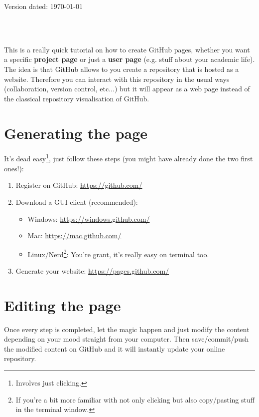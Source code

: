 \documentclass[a4paper,11pt]{article}
\begin{document}
\begin{flushright}
Version dated: \today
\end{flushright}
\begin{center}

\\
\bigskip
\\

\end{center}

This is a really quick tutorial on how to create GitHub pages, whether you want a specific \textbf{project page} or just a \textbf{user page} (e.g. stuff about your academic life).
The idea is that GitHub allows to you create a repository that is hosted as a website.
Therefore you can interact with this repository in the usual ways (collaboration, version control, etc...) but it will appear as a web page instead of the classical repository visualisation of GitHub.
\section{Generating the page}
It's dead easy\footnote{Involves just clicking.}, just follow these steps (you might have already done the two first ones!):
\begin{enumerate}
    \item{Register on GitHub:} \url{https://github.com/}

    \item{Download a GUI client (recommended):}\\
        \begin{itemize}
        \item{Windows: \url{https://windows.github.com/}}
        \item{Mac: \url{https://mac.github.com/}}
        \item{Linux/Nerd\footnote{If you're a bit more familiar with not only clicking but also copy/pasting stuff in the terminal window.}: You're grant, it's really easy on terminal too.}
        \end{itemize}

    \item{Generate your website:} \url{https://pages.github.com/}
\end{enumerate}

\section{Editing the page}
\setlength{\parindent}{5ex}
Once every step is completed, let the magic happen and just modify the content depending on your mood straight from your computer. Then save/commit/push the modified content on GitHub and it will instantly update your online repository.
\end{document}
